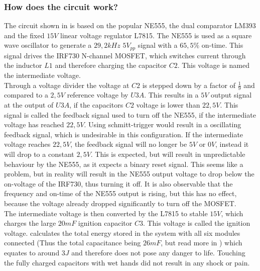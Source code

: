 \pagebreak

\subsubsection{How does the circuit work?}

\noindent The circuit shown in  is based on the popular NE555, the dual comparator LM393 and the fixed $15V$ linear voltage regulator L7815. The NE555 is used as a square wave oscillator to generate a $29,2kHz$ $5V_{pp}$ signal with a $65,5\%$ on-time. This signal drives the IRF730 N-channel MOSFET, which switches current through the inductor $L1$ and therefore charging the capacitor $C2$. This voltage is named the intermediate voltage.\\

\noindent Through a voltage divider the voltage at $C2$ is stepped down by a factor of $\frac{1}{9}$ and compared to a $2,5V$ reference voltage by $U3A$. This results in a $5V$ output signal at the output of $U3A$, if the capacitors $C2$ voltage is lower than $22,5V$. This signal is called the feedback signal used to turn off the NE555, if the intermediate voltage has reached $22,5V$. Using schmitt-trigger would result in a oscillating feedback signal, which is undesirable in this configuration. If the intermediate voltage reaches $22,5V$, the feedback signal will no longer be $5V$ or $0V$, instead it will drop to a constant $2,5V$. This is expected, but will result in unpredictable behaviour by the NE555, as it expects a binary reset signal. This seems like a problem, but in reality will result in the NE555 output voltage to drop below the on-voltage of the IRF730, thus turning it off. It is also observable that the frequency and on-time of the NE555 output is rising, but this has no effect, because the voltage already dropped significantly to turn off the MOSFET. \\

\noindent The intermediate voltage is then converted by the L7815 to stable $15V$, which charges the large $20mF$ ignition capacitor $C3$. This voltage is called the ignition voltage.  calculates the total energy stored in the system with all six modules connected (Thus the total capacitance being $26mF$, but read more in ) which equates to around $3J$ and therefore does not pose any  danger to life. Touching the fully charged capacitors with wet hands did not result in any shock or pain.\\

